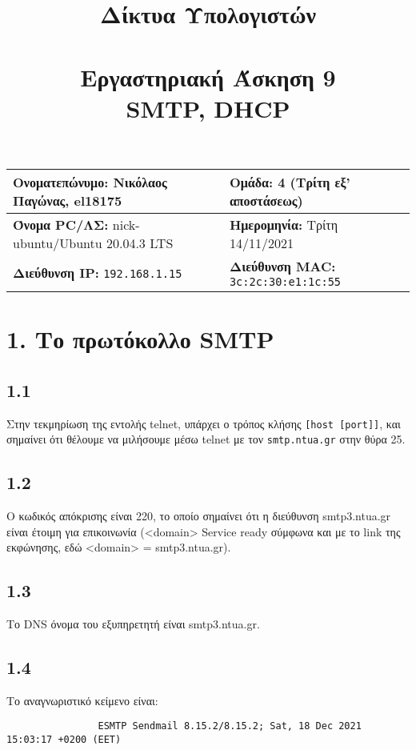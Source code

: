 

\newcommand{\imagesPath}{.}

\title{
	\textbf{Δίκτυα Υπολογιστών} \\~\\
	Εργαστηριακή Άσκηση 9 \\ 
	SMTP, DHCP
}
\author{}
\date{}


	\maketitle
	
	\begin{tabular}{|l|l|}
		\hline
		\textbf{Ονοματεπώνυμο:} Νικόλαος Παγώνας, el18175 & \textbf{Ομάδα:} 4 (Τρίτη εξ' αποστάσεως) \\
		\hline
		\textbf{Όνομα PC/ΛΣ:} nick-ubuntu/Ubuntu 20.04.3 LTS & \textbf{Ημερομηνία:} Τρίτη 14/11/2021 \\
		\hline
		\textbf{Διεύθυνση IP:} \verb|192.168.1.15| & \textbf{Διεύθυνση MAC:} \verb|3c:2c:30:e1:1c:55| \\
		\hline
	\end{tabular}

	\section*{1. Το πρωτόκολλο SMTP}
		\subsection*{1.1} 
			Στην τεκμηρίωση της εντολής telnet, υπάρχει ο τρόπος κλήσης \verb|[host [port]]|, και σημαίνει ότι θέλουμε να μιλήσουμε μέσω telnet με τον \verb|smtp.ntua.gr| στην θύρα 25.

		\subsection*{1.2} 
			Ο κωδικός απόκρισης είναι 220, το οποίο σημαίνει ότι η διεύθυνση smtp3.ntua.gr είναι έτοιμη για επικοινωνία (<domain> Service ready σύμφωνα και με το link της εκφώνησης, εδώ <domain> = smtp3.ntua.gr).

		\subsection*{1.3} 
			Το DNS όνομα του εξυπηρετητή είναι smtp3.ntua.gr.

		\subsection*{1.4} 
			Το αναγνωριστικό κείμενο είναι: \begin{verbatim}
				ESMTP Sendmail 8.15.2/8.15.2; Sat, 18 Dec 2021 15:03:17 +0200 (EET)
			\end{verbatim}
			
